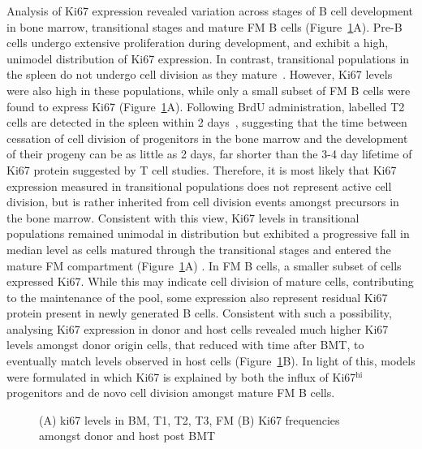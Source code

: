 \documentclass[12pt]{article}
\newcommand{\red}[1]{{\color{red}{#1}}}
\newcommand{\khi}{Ki67$^\text{hi}$}
\begin{document}
Analysis of Ki67 expression revealed variation across stages of B cell development in bone marrow, transitional stages and mature FM B cells (Figure~\ref{fig:Ki67}A). Pre-B cells undergo extensive proliferation during development, and exhibit a high, unimodel distribution of Ki67 expression. In contrast, transitional populations in the spleen do not undergo cell division as they mature~\citep{Srivastava:2005jja}. However, Ki67 levels were also high in these populations, while only a small subset of FM B cells were found to express Ki67 (Figure~\ref{fig:Ki67}A). Following BrdU administration, labelled T2 cells are detected in the spleen within 2 days~\citep{Srivastava:2005jja}, suggesting that the time between cessation of cell division of progenitors in the bone marrow and the development of their progeny can be as little as 2 days, far shorter than the 3-4 day lifetime of Ki67 protein suggested by T cell studies. Therefore, it is most likely that Ki67 expression measured in transitional populations does not represent active cell division, but is rather inherited from  cell division events amongst precursors in the bone marrow. Consistent with this view, Ki67 levels in transitional populations remained unimodal in distribution but exhibited a progressive fall in median level as cells matured through the transitional stages and entered the mature FM compartment (Figure~\ref{fig:Ki67}A) \red{NICE}. In FM B cells, a smaller subset of cells expressed Ki67. While this may indicate cell division of mature cells, contributing to the maintenance of the pool, some expression also represent residual Ki67 protein present in newly generated B cells. Consistent with such a possibility, analysing Ki67 expression in donor and host cells revealed much higher Ki67 levels amongst donor origin cells, that reduced with time after BMT, to eventually match levels observed in host cells (Figure~\ref{fig:Ki67}B). In light of this, models were formulated in which Ki67 is explained by both the influx of {\khi} progenitors and de novo cell division amongst mature FM B cells. 

	
	

\begin{figure}[htbp] %
   \centering
   \caption{(A) ki67 levels in BM, T1, T2, T3, FM (B) Ki67 frequencies amongst donor and host post BMT }
   \label{fig:Ki67}
\end{figure}
\end{document}
